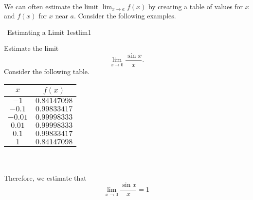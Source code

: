         \\
        We can often estimate the limit \(\lim_{x\to a}f(x)\) by creating a table of values for \(x\) and \(f(x)\) for \(x\) near \(a\). Consider the following examples.
        \begin{example}{\Difficulty\,\Difficulty\,\,Estimating a Limit 1}{estlim1}
            
            Estimate the limit
            \begin{equation*}
                \lim_{x\to 0}\frac{\sin x}{x}.
            \end{equation*}
            Consider the following table.
            \begin{center}
                \begin{tabular}{|cc|}
                    \hline
                    \(x\) & \(f(x)\) \\
                    \hline
                    \(-1\) & \(0.84147098\) \\
                    \(-0.1\) & \(0.99833417\) \\
                    \(-0.01\) & \(0.99998333\) \\
                    \(0.01\) & \(0.99998333\) \\
                    \(0.1\) & \(0.99833417\) \\
                    \(1\) & \(0.84147098\) \\
                    \hline
                \end{tabular}
            \end{center}
            \vphantom
            \\
            \\
            Therefore, we estimate that 
            \begin{equation*}
                \lim_{x\to 0}\frac{\sin x}{x}=1
            \end{equation*}

        \end{example}
